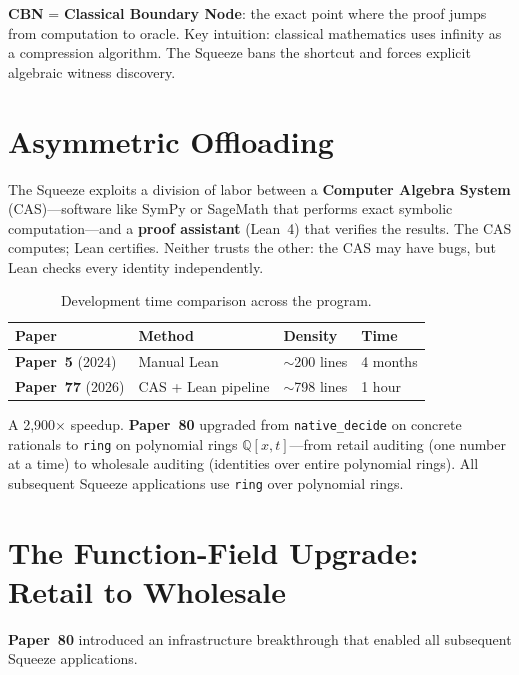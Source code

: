 \documentclass[11pt,twoside,openany]{report}
\theoremstyle{remark}
\newcommand{\paperref}[1]{\textbf{Paper~#1}}
\begin{document}
\textbf{CBN} = \textbf{Classical Boundary Node}: the exact point where the proof jumps from computation to oracle. Key intuition: classical mathematics uses infinity as a compression algorithm. The Squeeze bans the shortcut and forces explicit algebraic witness discovery.


\section{Asymmetric Offloading}

The Squeeze exploits a division of labor between a \textbf{Computer Algebra System} (CAS)---software like SymPy or SageMath that performs exact symbolic computation---and a \textbf{proof assistant} (Lean~4) that verifies the results. The CAS computes; Lean certifies. Neither trusts the other: the CAS may have bugs, but Lean checks every identity independently.

\begin{table}[htbp]
\centering\small
\caption{Development time comparison across the program.}
\label{tab:offloading}
\renewcommand{\arraystretch}{1.2}
\begin{tabular}{@{}l l l l@{}}
\toprule
\textbf{Paper} & \textbf{Method} & \textbf{Density} & \textbf{Time} \\
\midrule
\paperref{5} (2024) & Manual Lean & $\sim$200 lines & 4 months \\
\paperref{77} (2026) & CAS + Lean pipeline & $\sim$798 lines & 1 hour \\
\bottomrule
\end{tabular}
\end{table}

A 2,900$\times$ speedup. \paperref{80} upgraded from \texttt{native\_decide} on concrete rationals to \texttt{ring} on polynomial rings $\mathbb{Q}[x,t]$---from retail auditing (one number at a time) to wholesale auditing (identities over entire polynomial rings). All subsequent Squeeze applications use \texttt{ring} over polynomial rings.


\section{The Function-Field Upgrade: Retail to Wholesale}

\paperref{80} introduced an infrastructure breakthrough that enabled all subsequent Squeeze applications.
\end{document}
